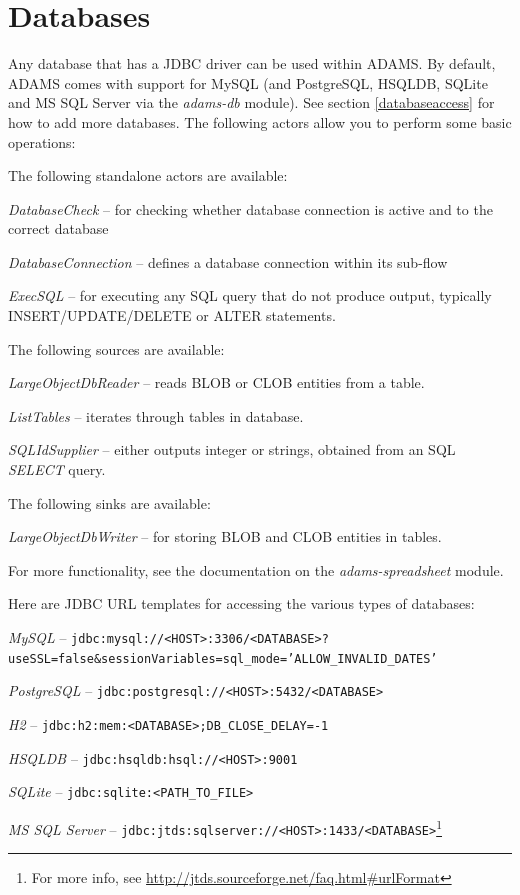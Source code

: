 \newpage
\section{Databases}
Any database that has a JDBC driver can be used within ADAMS. By default,
ADAMS comes with support for MySQL (and PostgreSQL, HSQLDB, SQLite and MS SQL
Server via the \textit{adams-db} module).
See section \ref{databaseaccess} for how to add more databases. The following
actors allow you to perform some basic operations:

\noindent The following standalone actors are available:
\begin{tight_itemize}
  \item \textit{DatabaseCheck} -- for checking whether database connection is active and to the correct database
  \item \textit{DatabaseConnection} -- defines a database connection within its sub-flow
  \item \textit{ExecSQL} -- for executing any SQL query that do not produce output, typically INSERT/UPDATE/DELETE
  or ALTER statements.
\end{tight_itemize}

\noindent The following sources are available:
\begin{tight_itemize}
  \item \textit{LargeObjectDbReader} -- reads BLOB or CLOB entities from a table.
  \item \textit{ListTables} -- iterates through tables in database.
  \item \textit{SQLIdSupplier} -- either outputs integer or strings, obtained from an SQL \textit{SELECT} query.
\end{tight_itemize}

\noindent The following sinks are available:
\begin{tight_itemize}
  \item \textit{LargeObjectDbWriter} -- for storing BLOB and CLOB entities in tables.
\end{tight_itemize}

For more functionality, see the documentation on the \textit{adams-spreadsheet}
module.

\noindent Here are JDBC URL templates for accessing the various types of databases:
\begin{tight_itemize}
  \item \textit{MySQL} -- \texttt{jdbc:mysql://<HOST>:3306/<DATABASE>?useSSL=false&sessionVariables=sql_mode='ALLOW_INVALID_DATES'}
  \item \textit{PostgreSQL} -- \texttt{jdbc:postgresql://<HOST>:5432/<DATABASE>}
  \item \textit{H2} -- \texttt{jdbc:h2:mem:<DATABASE>;DB_CLOSE_DELAY=-1}
  \item \textit{HSQLDB} -- \texttt{jdbc:hsqldb:hsql://<HOST>:9001}
  \item \textit{SQLite} -- \texttt{jdbc:sqlite:<PATH\_TO\_FILE>}
  \item \textit{MS SQL Server} -- \texttt{jdbc:jtds:sqlserver://<HOST>:1433/<DATABASE>}\footnote{For more info, see \url{http://jtds.sourceforge.net/faq.html\#urlFormat}{}}
\end{tight_itemize}


